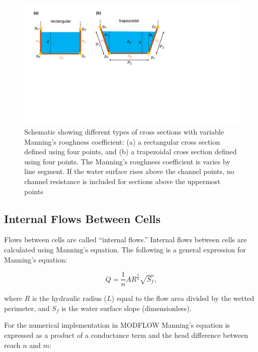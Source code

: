 \documentclass[fleqn]{article}
\begin{document}
\begin{figure}[h!tbp]
	\centering
	\includegraphics[scale=0.5]{figures/cxs_rough.pdf}
	\caption[Schematic showing different types of channel cross sections with variable roughness.]{Schematic showing different types of cross sections with variable Manning's roughness coefficient: (a) a rectangular cross section defined using four points, and (b) a trapezoidal cross section defined using four points.  The Manning's roughness coefficient is varies by line segment.  If the water surface rises above the channel points, no channel resistance is included for sections above the uppermost points}
	\label{fig:cxs_rough}
\end{figure}

\subsection{Internal Flows Between Cells}
Flows between cells are called ``internal flows.'' Internal flows between cells are calculated using Manning's equation.  The following is a general expression for Manning's equation:

\begin{equation}
  Q = \frac{1}{n} A R^{\frac{2}{3}} \sqrt{S_f},
\end{equation}

\noindent where $R$ is the hydraulic radius ($L$) equal to the flow area divided by the wetted perimeter, and $S_f$ is the water surface slope (dimensionless). 

For the numerical implementation in MODFLOW Manning's equation is expressed as a product of a conductance term and the head difference between reach $n$ and $m$:
\end{document}
